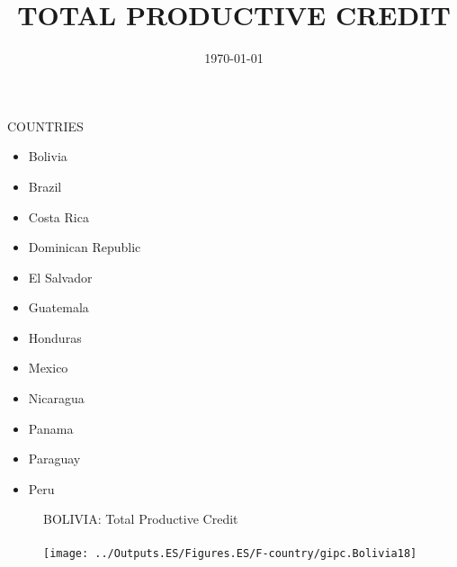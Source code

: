 \documentclass{beamer}
\title[Credit Type]{TOTAL PRODUCTIVE CREDIT}
\date{\today}
\begin{document}
	\begin{frame}
		\begin{center}
		\end{center}
	\end{frame}

\begin{frame}
    COUNTRIES
    \begin{multicols}{3}
	\begin{itemize}
		\item Bolivia
		\item Brazil
		\item Costa Rica
		\item Dominican Republic
		\item El Salvador
		\item Guatemala
		\item Honduras
		\item Mexico
		\item Nicaragua
		\item Panama
		\item Paraguay
		\item Peru
	\end{itemize}
\end{multicols}	
\end{frame}
%
%
\begin{frame}
	\begin{figure}
		\centering
		BOLIVIA: Total Productive Credit\\~\\
		\texttt{[image: ../Outputs.ES/Figures.ES/F-country/gipc.Bolivia18]}
	\end{figure}
\end{frame}
\end{document}
